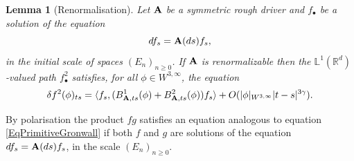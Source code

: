 \documentclass[11pt,a4paper]{amsart}
\newcommand{\RR}{\mathbb{R}}  \newcommand{\CC}{\mathbb{C}}  \newcommand{\LL}{\mathbb{L}}  \newcommand{\WW}{\mathbb{W}}
\renewcommand{\geq}{\geqslant}
\theoremstyle{plain}%
\newtheorem{lemma}[theorem]{Lemma}
\theoremstyle{definition}
\theoremstyle{remark}
\numberwithin{equation}{section} %
\begin{document}
\begin{lemma}[Renormalisation]
\label{Lemmarenormalisation}
Let $\bf A$ be a symmetric rough driver and $f_\bullet$ be a solution of the equation 
$$
df_s = {\bf A}(ds)f_s,
$$ 
in the initial scale of spaces $(E_n)_{n\geq 0}$. If $\bf A$ is renormalizable 
then the $\LL^1(\RR^d)$-valued path $f^2_\bullet$ satisfies, for all $\phi \in W^{3,\infty}$, the equation
\begin{equation} 
\label{EqPrimitiveGronwall}
\delta f^2(\phi)_{ts} =  \langle f_s , (B^1_{{\bf A},ts}(\phi) + B^2_{{\bf A},ts}(\phi)) f_s\rangle  + O (| \phi |_{W^{3,\infty}} | t - s |^{3 \gamma}) .
\end{equation}
 \end{lemma}

\smallskip
 
\noindent By polarisation the product $fg$ satisfies an equation analogous to equation \eqref{EqPrimitiveGronwall} if both $f$ and $g$ are solutions of the equation $df_s = {\bf A}(ds)f_s$, in the scale $(E_n)_{n\geq 0}$.

\bigskip
\end{document}
